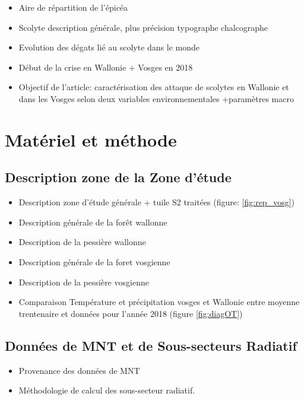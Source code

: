 \documentclass[3p,times]{elsarticle}
\begin{document}
\begin{itemize}
	\item Aire de répartition de l'épicéa
	\item Scolyte description générale, plus précision typographe chalcographe
	\item Evolution des dégats lié au scolyte dans le monde
	\item Début de la crise en Wallonie + Vosges en 2018
	\item Objectif de l'article: caractérisation des attaque de scolytes en Wallonie et dans les Vosges selon deux variables environnementales +paramètres macro 
\end{itemize}

\section{Matériel et méthode}

\subsection{Description zone de la Zone d'étude}

\begin{itemize}
	\item Description zone d'étude générale + tuile S2 traitées (figure: \ref{fig:rep_vosg}) 
	\item Description générale de la forêt wallonne 
	\item Description de la pessière wallonne 
	\item Description générale de la foret vosgienne 
	\item Description de la pessière vosgienne
	\item Comparaison Température et précipitation vosges et Wallonie entre moyenne trentenaire et données pour l'année 2018 (figure \ref{fig:diagOT})
	
\end{itemize}



\subsection{Données de MNT et de Sous-secteurs Radiatif}

\begin{itemize}
	\item Provenance des données de MNT
	\item Méthodologie de calcul des sous-secteur radiatif.
\end{itemize}
\end{document}
